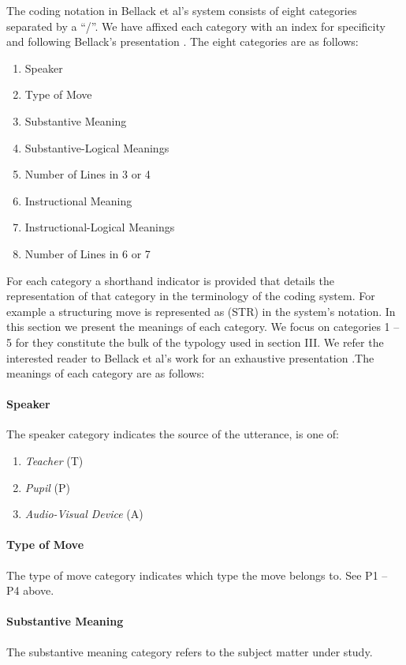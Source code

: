 \documentclass[conference]{IEEEtran}
\begin{document}
The coding notation in Bellack et al's system consists of eight categories
separated by a ``/''. We have affixed each category with an index for
specificity and following Bellack's presentation . The eight categories are as
follows:

\begin{enumerate}
  \item Speaker
  \item Type of Move
  \item Substantive Meaning
  \item Substantive-Logical Meanings
  \item Number of Lines in 3 or 4
  \item Instructional Meaning
  \item Instructional-Logical Meanings
  \item Number of Lines in 6 or 7
\end{enumerate}

For each category a shorthand indicator is provided that details the
representation of that category in the terminology of the coding system.
For example a structuring move is represented as (STR) in the system's
notation. In this section we present the meanings of each category. We focus on
categories 1 -- 5 for they constitute the bulk of the typology used in section
III. We refer the interested reader to Bellack et al's work for an
exhaustive presentation \cite{bellack1966language}.The meanings of each category are as follows:

\paragraph{Speaker}
The speaker category indicates the source of the utterance, is one of:
  \begin{enumerate}
    \item \emph{Teacher} (T)
    \item \emph{Pupil} (P)
    \item \emph{Audio-Visual Device} (A)
  \end{enumerate}
\paragraph{Type of Move}
The type of move category indicates which type the move
belongs to. See P1 -- P4 above.

\paragraph{Substantive Meaning}
The substantive meaning category refers to
the subject matter under study.
\end{document}
